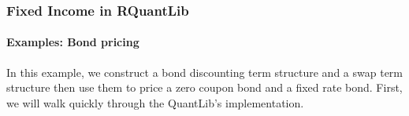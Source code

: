 \documentclass[smaller,compress, 9pt]{beamer}
\begin{document}
\begin{frame}
	\frametitle{Fixed Income in RQuantLib}
	\framesubtitle{Examples: Bond pricing}	
In this example, we construct a bond discounting term structure and a swap term structure then use them to price a zero coupon bond and a fixed rate bond. First, we will walk quickly through the QuantLib's implementation.
\vskip5pt
\pagecolor{bgcolor}
\tiny
\noindent
\ttfamily
\hlstd{}\hspace*{\fill}\\
\hlstd{}\hspace*{\fill}\\
\hlstd{}\hspace*{\fill}\\
\hspace*{\fill}\\
\hlstd{}\hspace*{\fill}\\
\hlstd{}\hspace*{\fill}\\
\hlstd{}\hspace*{\fill}\\
\hlsym{;}\hspace*{\fill}\\
\hlstd{}\hspace*{\fill}\\
\hspace*{\fill}\\
\hlstd{}\hlsym{\{}\hspace*{\fill}\\
\hlstd{}\hlsym{()\ \{\ }\hlstd{}\hlstd{}\hlstd{}\hlsym{;\ \}}\hspace*{\fill}\\
\hlstd{}\hspace*{\fill}\\
\hlsym{\}}\hspace*{\fill}\\
\hlstd{}\hspace*{\fill}\\
\hlstd{}\hspace*{\fill}\\

\end{frame}
\end{document}
